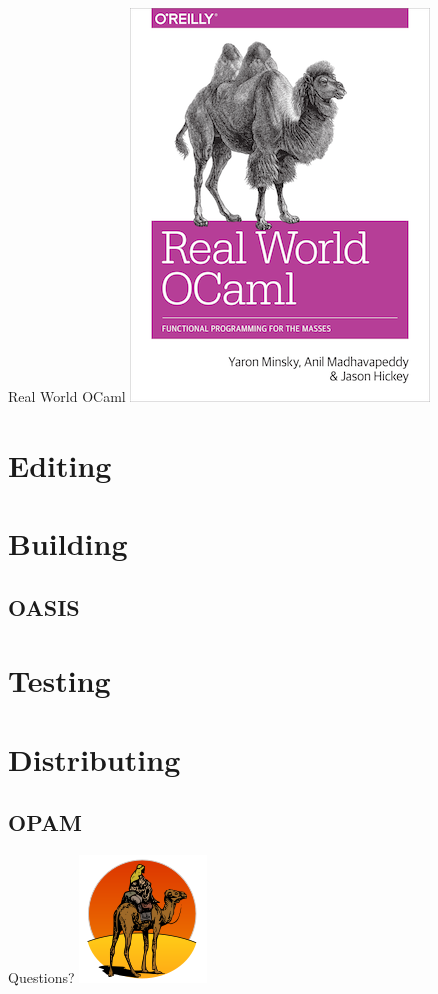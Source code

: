 \documentclass{beamer}
\begin{document}
\begin{frame}{Real World OCaml}
  \includegraphics{rwo}
\end{frame}

\section{Editing}

\section{Building}

\subsection{OASIS}

\section{Testing}

\section{Distributing}

\subsection{OPAM}

\begin{frame}{Questions?}
  \centering
  \includegraphics[height=.85\textheight]{camel}
\end{frame}
\end{document}
